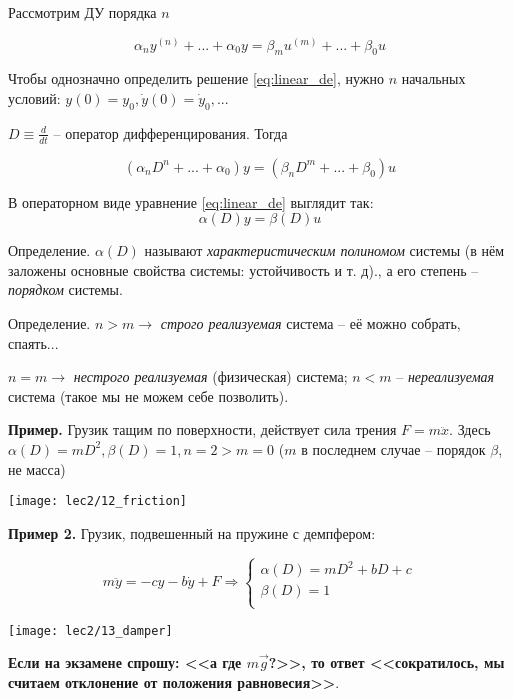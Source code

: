\documentclass[main.tex]{subfiles}
\begin{document}
Рассмотрим ДУ порядка $ n $

\begin{equation}\label{eq:linear_de}
    \alpha_n y^{(n)} + ... + \alpha_0 y = \beta_m u^{(m)} + ... + \beta_0 u
\end{equation}

Чтобы однозначно определить решение \eqref{eq:linear_de}, нужно $ n $ начальных условий: $ y(0)=y_0, \dot y(0) = \dot y_0, ... $

$ D \equiv \frac{d}{dt} $ -- оператор дифференцирования.
Тогда

\begin{equation}
	(\alpha_n D^n + ... + \alpha_0) y = (\beta_n D^m + ... + \beta_0) u
\end{equation}

В операторном виде уравнение \eqref{eq:linear_de} выглядит так:
\begin{equation*}
    	\boxed{ \alpha (D) y = \beta(D) u }
\end{equation*}

Определение. $ \alpha(D) $ называют \emph{характеристическим полиномом} системы (в нём заложены основные свойства системы: устойчивость и т. д)., а его степень -- \emph{порядком} системы.

Определение. $ n > m \to $ \emph{строго реализуемая} система -- её можно собрать, спаять...

$ n = m \to $ \emph{нестрого реализуемая} (физическая) система; $ n < m $ -- \emph{нереализуемая} система (такое мы не можем себе позволить).

\textbf{Пример.} Грузик тащим по поверхности, действует сила трения $ F = m \ddot x $. Здесь $ \alpha(D) = mD^2, \beta(D) = 1, n = 2 > m = 0 $ ($ m $ в последнем случае -- порядок $ \beta $, не масса)

\texttt{[image: lec2/12\_friction]}

\textbf{Пример 2.} Грузик, подвешенный на пружине с демпфером:

\[ m \ddot y = - c y - b \dot y + F \Rightarrow \begin{cases}
    \alpha(D) = mD^2 + bD + c \\
    \beta(D) = 1 \\
\end{cases} \]

\texttt{[image: lec2/13\_damper]}

\textbf{Если на экзамене спрошу: <<а где $ m\vec{g} $?>>, то ответ <<сократилось, мы считаем отклонение от положения равновесия>>}.
\end{document}
